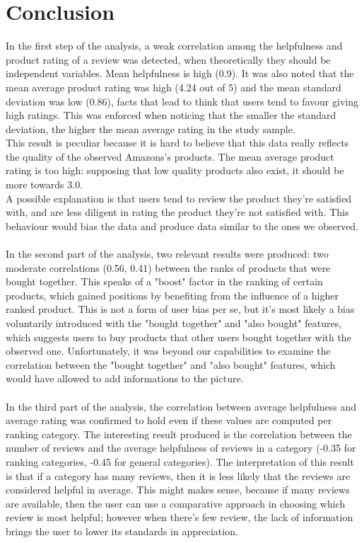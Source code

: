 \documentclass[11pt]{article}
\begin{document}
\section{Conclusion}
In the first step of the analysis, a weak correlation among the helpfulness and product rating of a review was detected, when theoretically they should be independent variables. Mean helpfulness is high (0.9). It was also noted that the mean average product rating was high (4.24 out of 5) and the mean standard deviation was low (0.86), facts that lead to think that users tend to favour giving high ratings. This was enforced when noticing that the smaller the standard deviation, the higher the mean average rating in the study sample. \\
This result is peculiar because it is hard to believe that this data really reflects the quality of the observed Amazons's products. The mean average product rating is too high: supposing that low quality products also exist, it should be more towards 3.0. 
\\A possible explanation is that users tend to review the product they're satisfied with, and are less diligent in rating the product they're not satisfied with. This behaviour would bias the data and produce data similar to the ones we observed.\\\\
In the second part of the analysis, two relevant results were produced: two moderate correlations (0.56, 0.41) between the ranks of products that were bought together. This speaks of a "boost" factor in the ranking of certain products, which gained positions by benefiting from the influence of a higher ranked product. This is not a form of user bias per se, but it's most likely  a bias voluntarily introduced with the "bought together" and "also bought" features, which suggests users to buy products that other users bought together with the observed one. Unfortunately, it was beyond our capabilities to examine the correlation between the "bought together" and  "also bought"  features, which would have allowed to add informations to the picture.\\\\
In the third part of the analysis, the correlation between average helpfulness and average rating was confirmed to hold even if these values are computed per ranking category. The interesting result produced is the correlation between the number of reviews and the average helpfulness of reviews in a category (-0.35 for ranking categories, -0.45 for general categories). The interpretation of this result is that if a category has many reviews, then it is less likely that the reviews are considered helpful in average. This might makes sense, because if many reviews are available, then the user can use a comparative approach in choosing which review is most helpful; however when there's few review, the lack of information brings the user to lower its standards in appreciation. \\\\
\end{document}
